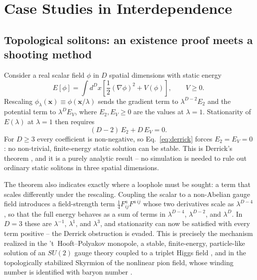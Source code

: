 \section{Case Studies in Interdependence}

\subsection{Topological solitons: an existence proof meets a shooting method}

Consider a real scalar field $\phi$ in $D$ spatial dimensions with static energy
\begin{equation}
E[\phi] = \int d^D x \left[ \frac{1}{2}(\nabla \phi)^2 + V(\phi) \right], \qquad V \geq 0.
\label{eq:scalar-energy}
\end{equation}
Rescaling $\phi_\lambda(\mathbf{x}) \equiv \phi(\mathbf{x}/\lambda)$ sends the
gradient term to $\lambda^{D-2}E_2$ and the potential term to $\lambda^D E_V$,
where $E_2, E_V \geq 0$ are the values at $\lambda=1$. Stationarity of
$E(\lambda)$ at $\lambda=1$ then requires
\begin{equation}
(D-2)\,E_2 + D\,E_V = 0.
\label{eq:derrick}
\end{equation}
For $D \geq 3$ every coefficient is non-negative, so Eq.~\eqref{eq:derrick}
forces $E_2 = E_V = 0$: no non-trivial, finite-energy static solution can be
stable. This is Derrick's theorem \cite{Derrick1964}, and it is a purely
analytic result -- no simulation is needed to rule out ordinary static solitons
in three spatial dimensions.

The theorem also indicates exactly where a loophole must be sought: a term that
scales differently under the rescaling. Coupling the scalar to a non-Abelian
gauge field introduces a field-strength term $\tfrac{1}{4}F_{ij}^aF^{a\,ij}$
whose two derivatives scale as $\lambda^{D-4}$, so that the full energy behaves
as a sum of terms in $\lambda^{D-4}$, $\lambda^{D-2}$, and $\lambda^D$. In
$D=3$ these are $\lambda^{-1}$, $\lambda^{1}$, and $\lambda^{3}$, and
stationarity can now be satisfied with every term positive -- the Derrick
obstruction is evaded. This is precisely the mechanism realized in the
't~Hooft--Polyakov monopole, a stable, finite-energy, particle-like solution of
an $SU(2)$ gauge theory coupled to a triplet Higgs field \cite{Hooft1974}, and
in the topologically stabilized Skyrmion of the nonlinear pion field, whose
winding number is identified with baryon number \cite{Skyrme1962}.

